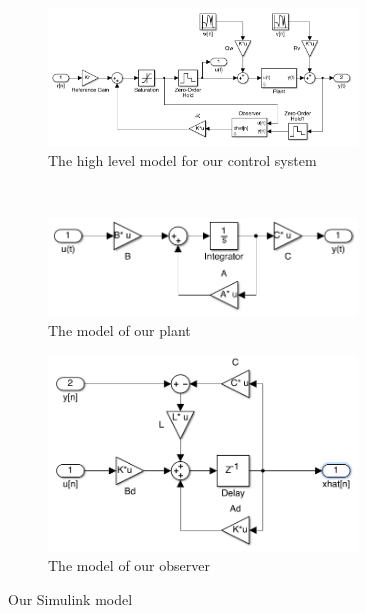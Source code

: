 \documentclass[11pt]{article}
\begin{document}
\begin{figure}[h]
\centering
    \begin{subfigure}[b]{0.65\textwidth}
        \includegraphics[width=0.9\textwidth]{system}
        \caption{The high level model for our control system}
        \label{fig:system}
    \end{subfigure}
    \\
    \begin{subfigure}[b]{0.35\textwidth}
        \includegraphics[width=0.9\textwidth]{plant}
        \caption{The model of our plant}
        \label{fig:plant}
    \end{subfigure}
    \begin{subfigure}[b]{0.35\textwidth}
        \includegraphics[width=0.9\textwidth]{observer}
        \caption{The model of our observer}
        \label{fig:observer}
    \end{subfigure}
    \caption{Our Simulink model}\label{fig:simulink}
\end{figure}
\end{document}
